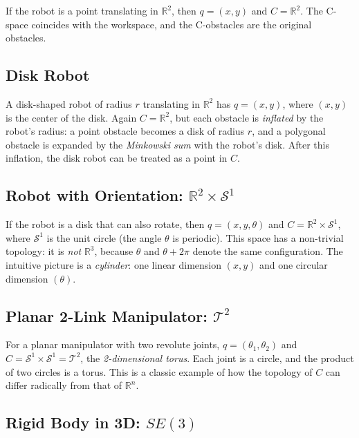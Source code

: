 If the robot is a point translating in \( \mathbb{R}^2 \), then
\( q = (x, y) \) and \( C = \mathbb{R}^2 \). The C-space coincides
with the workspace, and the C-obstacles are the original obstacles.

\subsection{Disk Robot}
\label{subsec:disk-robot}

A disk-shaped robot of radius \( r \) translating in \( \mathbb{R}^2 \)
has \( q = (x, y) \), where \( (x, y) \) is the center of the disk.
Again \( C = \mathbb{R}^2 \), but each obstacle is \emph{inflated} by
the robot's radius: a point obstacle becomes a disk of radius \( r \),
and a polygonal obstacle is expanded by the \emph{Minkowski sum} with
the robot's disk. After this inflation, the disk robot can be treated
as a point in \( C \).

\subsection{Robot with Orientation: \( \mathbb{R}^2 \times \mathcal{S}^1 \)}
\label{subsec:cspace-orientation}

If the robot is a disk that can also rotate, then
\( q = (x, y, \theta) \) and \( C = \mathbb{R}^2 \times \mathcal{S}^1 \),
where \( \mathcal{S}^1 \) is the unit circle (the angle \( \theta \) is
periodic). This space has a non-trivial topology: it is \emph{not}
\( \mathbb{R}^3 \), because \( \theta \) and \( \theta + 2\pi \) denote
the same configuration. The intuitive picture is a \emph{cylinder}:
one linear dimension \( (x, y) \) and one circular dimension
\( (\theta) \).

\subsection{Planar 2-Link Manipulator: \( \mathcal{T}^2 \)}
\label{subsec:cspace-2link}

For a planar manipulator with two revolute joints,
\( q = (\theta_1, \theta_2) \) and
\( C = \mathcal{S}^1 \times \mathcal{S}^1 = \mathcal{T}^2 \), the
\emph{2-dimensional torus}. Each joint is a circle, and the product
of two circles is a torus. This is a classic example of how the
topology of \( C \) can differ radically from that of
\( \mathbb{R}^n \).

\subsection{Rigid Body in 3D: \( SE(3) \)}
\label{subsec:cspace-se3}

